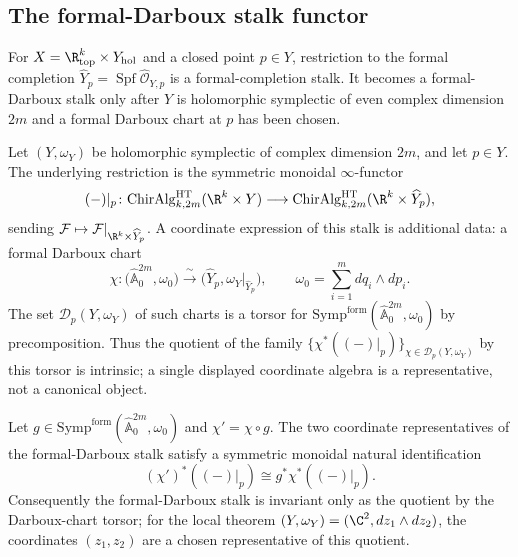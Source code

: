 \subsection{The formal-Darboux stalk functor}\label{app:hfc:darboux-stalk-functor}

For \(X=\R^k_{\mathrm{top}}\times Y_{\mathrm{hol}}\) and a closed point
\(p\in Y\), restriction to the formal completion
\(\widehat Y_p=\operatorname{Spf}\widehat{\mathcal O}_{Y,p}\) is a
formal-completion stalk.  It becomes a formal-Darboux stalk only after
\(Y\) is holomorphic symplectic of even complex dimension \(2m\) and a
formal Darboux chart at \(p\) has been chosen.

\begin{defn}\label{app:defn:Darboux-stalk-functor}
Let \((Y,\omega_Y)\) be holomorphic symplectic of complex dimension
\(2m\), and let \(p\in Y\).  The underlying restriction is the symmetric
monoidal \(\infty\)-functor
\[
  (-)|_{p}\colon
  \mathrm{ChirAlg}^{\mathrm{HT}}_{k,2m}(\R^k\times Y)
   \longrightarrow
  \mathrm{ChirAlg}^{\mathrm{HT}}_{k,2m}(\R^k\times\widehat Y_p),
\]
sending \(\mathcal F\mapsto
\mathcal F|_{\R^k\times\widehat Y_p}\).  A coordinate expression of this
stalk is additional data: a formal Darboux chart
\[
  \chi\colon
  \bigl(\widehat{\mathbb A}^{2m}_0,\omega_0\bigr)
  \xrightarrow{\;\sim\;}
  \bigl(\widehat Y_p,\omega_Y|_{\widehat Y_p}\bigr),
  \qquad
  \omega_0=\sum_{i=1}^m dq_i\wedge dp_i .
\]
The set \(\mathscr D_p(Y,\omega_Y)\) of such charts is a torsor for
\(\mathrm{Symp}^{\mathrm{form}}(\widehat{\mathbb A}^{2m}_0,\omega_0)\)
by precomposition.  Thus the quotient of the family
\(\{\chi^*((-)|_p)\}_{\chi\in\mathscr D_p(Y,\omega_Y)}\) by this torsor
is intrinsic; a single displayed coordinate algebra is a representative,
not a canonical object.
\end{defn}

\begin{prop}\label{app:prop:Darboux-equivariance}
Let \(g\in
\mathrm{Symp}^{\mathrm{form}}(\widehat{\mathbb A}^{2m}_0,\omega_0)\) and
\(\chi'\!=\chi\circ g\).  The two coordinate representatives of the
formal-Darboux stalk satisfy a symmetric monoidal natural identification
\[
  (\chi')^*((-)|_p)\cong g^*\chi^*((-)|_p).
\]
Consequently the formal-Darboux stalk is invariant only as the quotient
by the Darboux-chart torsor; for the local theorem
\((Y,\omega_Y)=(\C^2,dz_1\wedge dz_2)\), the coordinates
\((z_1,z_2)\) are a chosen representative of this quotient.
\end{prop}

